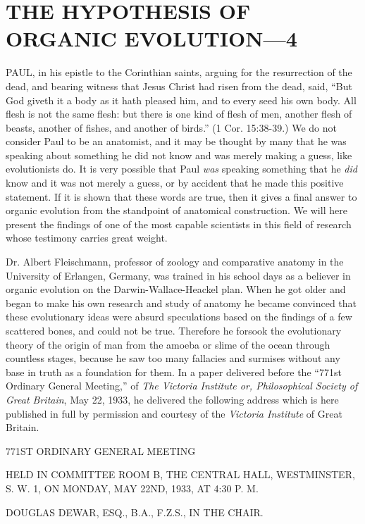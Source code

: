 \chapter{THE HYPOTHESIS OF ORGANIC EVOLUTION—4}

PAUL, in his epistle to the Corinthian saints, arguing for the resurrection of the dead, and
bearing witness that Jesus Christ had risen from the dead, said, ``But God giveth it a body as
it hath pleased him, and to every seed his own body. All flesh is not the same flesh: but there
is one kind of flesh of men, another flesh of beasts, another of fishes, and another of birds.''
(1 Cor. 15:38-39.) We do not consider Paul to be an anatomist, and it may be thought by
many that he was speaking about something he did not know and was merely making a
guess, like evolutionists do. It is very possible that Paul \textit{was} speaking something that he \textit{did}
know and it was not merely a guess, or by accident that he made this positive statement. If it
is shown that these words are true, then it gives a final answer to organic evolution from the
standpoint of anatomical construction. We will here present the findings of one of the most
capable scientists in this field of research whose testimony carries great weight.

Dr. Albert Fleischmann, professor of zoology and comparative anatomy in the University of
Erlangen, Germany, was trained in his school days as a believer in organic evolution on the
Darwin-Wallace-Heackel plan. When he got older and began to make his own research and
study of anatomy he became convinced that these evolutionary ideas were absurd
speculations based on the findings of a few scattered bones, and could not be true. Therefore
he forsook the evolutionary theory of the origin of man from the amoeba or slime of the
ocean through countless stages, because he saw too many fallacies and surmises without any
base in truth as a foundation for them. In a paper delivered before the ``771st Ordinary
General Meeting,'' of \textit{The Victoria Institute or, Philosophical Society of Great Britain}, May
22, 1933, he delivered the following address which is here published in full by permission
and courtesy of the \textit{Victoria Institute} of Great Britain.

771ST ORDINARY GENERAL MEETING

HELD IN COMMITTEE ROOM B, THE CENTRAL HALL, WESTMINSTER, S. W. 1,
ON MONDAY, MAY 22ND, 1933, AT 4:30 P. M.

DOUGLAS DEWAR, ESQ., B.A., F.Z.S., IN THE CHAIR.

